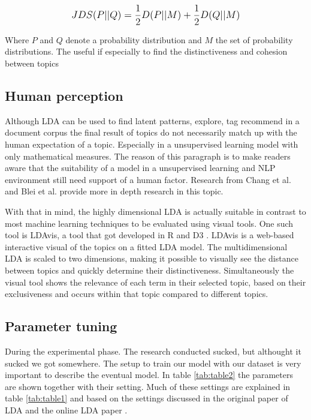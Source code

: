 \[
\mathlarger{JDS(P||Q) = \frac{1}{2}D(P||M) + \frac{1}{2}D(Q||M)}
\]

Where $P$ and $Q$ denote a probability distribution and $M$ the set of probability distributions. The useful if especially to find the distinctiveness and cohesion between topics

\subsection{Human perception}\label{methodology:humanperception}
Although LDA can be used to find latent patterns, explore, tag recommend in a document corpus the final result of topics do not necessarily match up with the human expectation of a topic. Especially in a unsupervised learning model with only mathematical measures\cite{Towne2016MeasuringPerception}. The reason of this paragraph is to make readers aware that the suitability of a model in a unsupervised learning and NLP environment still need support of a human factor. Research from Chang  et al. \cite{Chang2009ReadingModels} and Blei et al. \cite{Chaney2012VisualizingModels.} provide more in depth research in this topic.  

With that in mind, the highly dimensional LDA is actually suitable in contrast to most machine learning techniques to be evaluated using visual tools. One such tool is LDAvis, a tool that got developed in R and D3 \cite{Sievert2014}. LDAvis is a web-based interactive visual of the topics on a fitted LDA model. The multidimensional LDA is scaled to two dimensions, making it possible to visually see the distance between topics and quickly determine their distinctiveness. Simultaneously the visual tool shows the relevance of each term in their selected topic, based on their exclusiveness and occurs within that topic compared to different topics.

\subsection{Parameter tuning}\label{methodology:parameter tuning}
During the experimental phase. The research conducted sucked, but althought it sucked we got somewhere. 
The setup to train our model with our dataset is very important to describe the eventual model. In table \ref{tab:table2} the parameters are shown together with their setting. Much of these settings are explained in table \ref{tab:table1} and based on the settings discussed in the original paper of LDA \cite{Blei2003} and the online LDA paper \cite{Hoffman2010OnlineAllocation}. 
